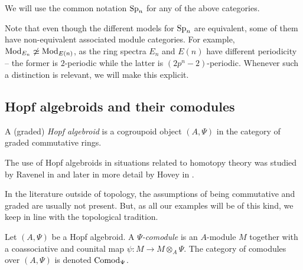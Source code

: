 \begin{notation}
    We will use the common notation $\mathrm{Sp}_{n}$ for any of the above categories. 
\end{notation}

\begin{remark}
    Note that even though the different models for $\mathrm{Sp}_{n}$ are equivalent, some of them have non-equivalent associated module categories. For example, $\mathrm{Mod}_{E_n}\not \simeq \mathrm{Mod}_{E(n)}$, as the ring spectra $E_n$ and $E(n)$ have different periodicity -- the former is $2$-periodic while the latter is $(2p^n-2)$-periodic. Whenever such a distinction is relevant, we will make this explicit. 
\end{remark}

























\subsection{Hopf algebroids and their comodules}
\label{ch1:ssec:hopf-algebroids-and-their-comodules}



\begin{definition}
    \label{def:hopf-algebroid}
    A (graded) \emph{Hopf algebroid} is a cogroupoid object $(A, \Psi)$ in the category of graded commutative rings. 
\end{definition}

The use of Hopf algebroids in situations related to homotopy theory was studied by Ravenel in \cite[A.1]{ravenel_86} and later in more detail by Hovey in \cite{hovey_04}. 

\begin{remark}
    In the literature outside of topology, the assumptions of being commutative and graded are usually not present. But, as all our examples will be of this kind, we keep in line with the topological tradition. 
\end{remark}

\begin{definition}
    \label{def:comodule-over-hopf-algebroid}
    Let $(A, \Psi)$ be a Hopf algebroid. A \emph{$\Psi$-comodule} is an $A$-module $M$ together with a coassociative and counital map $\psi\colon M\longrightarrow M\otimes_A \Psi$. The category of comodules over $(A, \Psi)$ is denoted \emph{$\mathrm{Comod}_\Psi$}. 
\end{definition}

